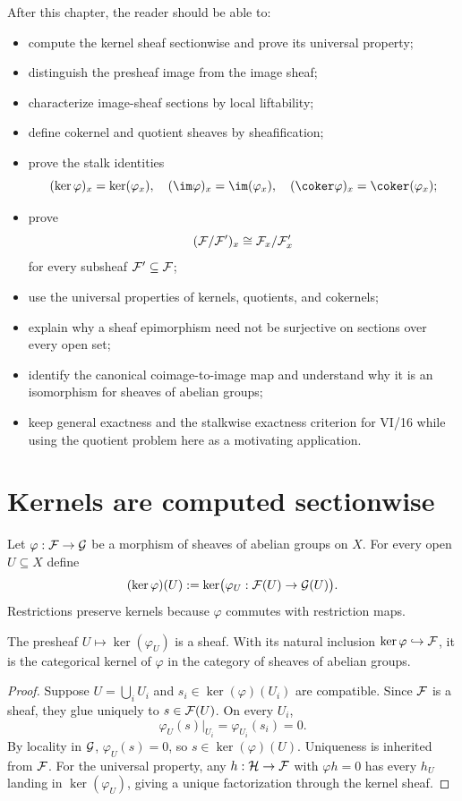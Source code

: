 After this chapter, the reader should be able to:
\begin{itemize}
\item compute the kernel sheaf sectionwise and prove its universal property;
\item distinguish the presheaf image from the image sheaf;
\item characterize image-sheaf sections by local liftability;
\item define cokernel and quotient sheaves by sheafification;
\item prove the stalk identities
\[
(\ker\varphi)_x=\ker(\varphi_x),\quad
(\im\varphi)_x=\im(\varphi_x),\quad
(\coker\varphi)_x=\coker(\varphi_x);
\]
\item prove
\[
(\mathcal F/\mathcal F')_x\cong\mathcal F_x/\mathcal F'_x
\]
for every subsheaf $\mathcal F'\subseteq\mathcal F$;
\item use the universal properties of kernels, quotients, and cokernels;
\item explain why a sheaf epimorphism need not be surjective on sections over every open set;
\item identify the canonical coimage-to-image map and understand why it is an isomorphism for
sheaves of abelian groups;
\item keep general exactness and the stalkwise exactness criterion for VI/16 while using the
quotient problem here as a motivating application.
\end{itemize}

\section{Kernels are computed sectionwise}

Let $\varphi:\mathcal F\to\mathcal G$ be a morphism of sheaves of abelian groups on $X$.
For every open $U\subseteq X$ define
\[
(\ker\varphi)(U):=\ker\bigl(\varphi_U:\mathcal F(U)\to\mathcal G(U)\bigr).
\]
Restrictions preserve kernels because $\varphi$ commutes with restriction maps.

\begin{theorem}
The presheaf $U\mapsto\ker(\varphi_U)$ is a sheaf.  With its natural inclusion
$\ker\varphi\hookrightarrow\mathcal F$, it is the categorical kernel of $\varphi$ in the category
of sheaves of abelian groups.
\end{theorem}
\begin{proof}
Suppose $U=\bigcup_iU_i$ and $s_i\in\ker(\varphi)(U_i)$ are compatible.  Since $\mathcal F$ is a
sheaf, they glue uniquely to $s\in\mathcal F(U)$.  On every $U_i$,
\[
\varphi_U(s)|_{U_i}=\varphi_{U_i}(s_i)=0.
\]
By locality in $\mathcal G$, $\varphi_U(s)=0$, so $s\in\ker(\varphi)(U)$.  Uniqueness is inherited
from $\mathcal F$.  For the universal property, any $h:\mathcal H\to\mathcal F$ with $\varphi h=0$ has every
$h_U$ landing in $\ker(\varphi_U)$, giving a unique factorization through the kernel sheaf.
\end{proof}

